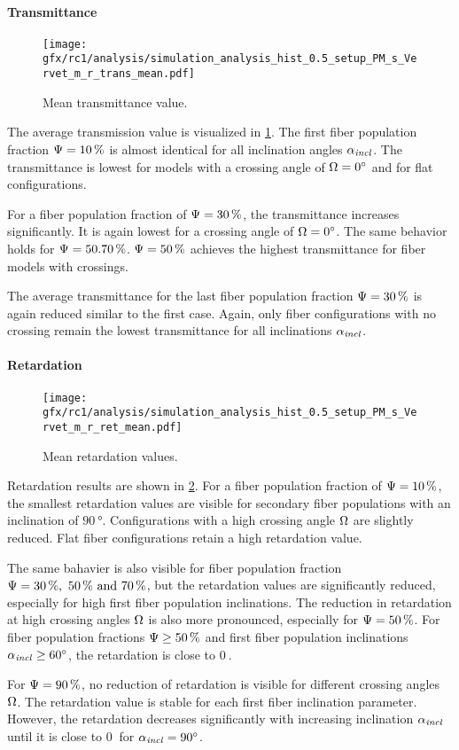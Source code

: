 \paragraph{Transmittance}
% 
\begin{figure}[!p]
\centering
\texttt{[image: gfx/rc1/analysis/simulation\_analysis\_hist\_0.5\_setup\_PM\_s\_Vervet\_m\_r\_trans\_mean.pdf]}
\caption{Mean transmittance value. }
\label{fig:sim_ana_trans}
\end{figure}
% 
The average transmission value is visualized in \cref{fig:sim_ana_trans}.
The first fiber population fraction $\textnormal{$\Psi$}=\SI{10}{\percent}$ is almost identical for all inclination angles $\textnormal{$\alpha_{\mathit{incl}}$}$.
The transmittance is lowest for models with a crossing angle of $\textnormal{$\Omega$} = \SI{0}{\degree}$ and for flat configurations.
\par
%
For a fiber population fraction of $\textnormal{$\Psi$}=\SI{30}{\percent}$, the transmittance increases significantly.
It is again lowest for a crossing angle of $\textnormal{$\Omega$}=\SI{0}{\degree}$.
The same behavior holds for $\modelPsi=\SIlist{50,70}{\percent}$.
$\textnormal{$\Psi$}=\SI{50}{\percent}$ achieves the highest transmittance for fiber models with crossings.
\par
% 
The average transmittance for the last fiber population fraction $\textnormal{$\Psi$}=\SI{30}{\percent}$ is again reduced similar to the first case.
Again, only fiber configurations with no crossing remain the lowest transmittance for all inclinations $\textnormal{$\alpha_{\mathit{incl}}$}$.
%
% 
% 
\paragraph{Retardation}
% 
\begin{figure}[!p]
\centering
\texttt{[image: gfx/rc1/analysis/simulation\_analysis\_hist\_0.5\_setup\_PM\_s\_Vervet\_m\_r\_ret\_mean.pdf]}
\caption{Mean retardation values. }
\label{fig:sim_ana_ret}
\end{figure}
% 
Retardation results are shown in \cref{fig:sim_ana_ret}.
For a fiber population fraction of $\textnormal{$\Psi$}=\SI{10}{\percent}$, the smallest retardation values are visible for secondary fiber populations with an inclination of $\SI{90}{\degree}$.
Configurations with a high crossing angle $\textnormal{$\Omega$}$ are slightly reduced.
Flat fiber configurations retain a high retardation value.
\par
%
The same bahavier is also visible for fiber population fraction $\modelPsi=\SIlist{30;50;70}{\percent}$, but the retardation values are significantly reduced, especially for high first fiber population inclinations.
The reduction in retardation at high crossing angles $\textnormal{$\Omega$}$ is also more pronounced, especially for $\textnormal{$\Psi$}=\SI{50}{\percent}$.
For fiber population fractions $\textnormal{$\Psi$} \geq \SI{50}{\percent}$ and first fiber population inclinations $\textnormal{$\alpha_{\mathit{incl}}$} \geq \SI{60}{\degree}$, the retardation is close to $\SI{0}{}$.
\par
%
For $\textnormal{$\Psi$}=\SI{90}{\percent}$, no reduction of retardation is visible for different crossing angles $\textnormal{$\Omega$}$.
The retardation value is stable for each first fiber inclination parameter.
However, the retardation decreases significantly with increasing inclination $\textnormal{$\alpha_{\mathit{incl}}$}$ until it is close to $\SI{0}{}$ for $\textnormal{$\alpha_{\mathit{incl}}$}=\SI{90}{\degree}$.
% 
% 
% 
